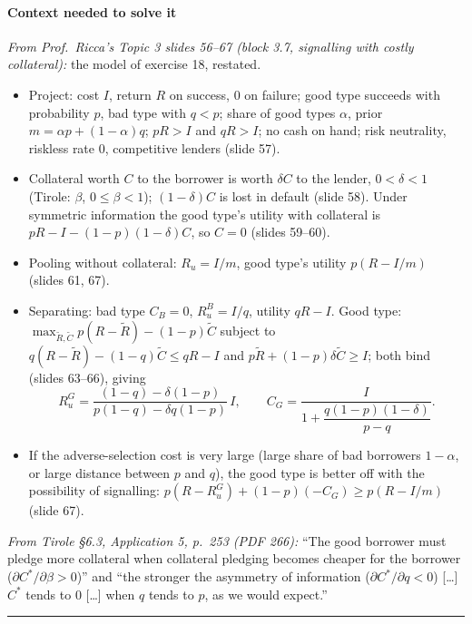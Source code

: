 \documentclass[11pt,a4paper]{article}
\providecommand{\tightlist}{\setlength{\itemsep}{0pt}\setlength{\parskip}{0pt}}
\newcommand{\stmtend}{\par\endgroup\nopagebreak\noindent\rule{\linewidth}{0.4pt}\par\medskip}
\begin{document}
\paragraph{Context needed to solve it}

\emph{From Prof.~Ricca's Topic 3 slides 56--67 (block 3.7, signalling with costly collateral):} the
model of exercise 18, restated.

\begin{itemize}
\tightlist
\item
  Project: cost \(I\), return \(R\) on success, 0 on failure; good type succeeds with probability
  \(p\), bad type with \(q < p\); share of good types \(\alpha\), prior
  \(m = \alpha p + (1 - \alpha)q\); \(pR > I\) and \(qR > I\); no cash on hand; risk neutrality,
  riskless rate 0, competitive lenders (slide 57).
\item
  Collateral worth \(C\) to the borrower is worth \(\delta C\) to the lender, \(0 < \delta < 1\)
  (Tirole: \(\beta\), \(0 \le \beta < 1\)); \((1 - \delta)C\) is lost in default (slide 58). Under
  symmetric information the good type's utility with collateral is
  \(pR - I - (1 - p)(1 - \delta)C\), so \(C = 0\) (slides 59--60).
\item
  Pooling without collateral: \(R_u = I/m\), good type's utility \(p(R - I/m)\) (slides 61, 67).
\item
  Separating: bad type \(C_B = 0\), \(R_u^B = I/q\), utility \(qR - I\). Good type:
  \(\max_{\tilde R, \tilde C} p(R - \tilde R) - (1 - p)\tilde C\) subject to
  \(q(R - \tilde R) - (1 - q)\tilde C \le qR - I\) and \(p\tilde R + (1 - p)\delta\tilde C \ge I\);
  both bind (slides 63--66), giving
  \[R_u^G = \frac{(1 - q) - \delta(1 - p)}{p(1 - q) - \delta q(1 - p)}\,I, \qquad C_G = \frac{I}{1 + \dfrac{q(1 - p)(1 - \delta)}{p - q}}.\]
\item
  If the adverse-selection cost is very large (large share of bad borrowers \(1 - \alpha\), or large
  distance between \(p\) and \(q\)), the good type is better off with the possibility of signalling:
  \(p(R - R_u^G) + (1 - p)(-C_G) \ge p(R - I/m)\) (slide 67).
\end{itemize}

\emph{From Tirole §6.3, Application 5, p.~253 (PDF 266):} ``The good borrower must pledge more
collateral when collateral pledging becomes cheaper for the borrower
(\(\partial C^*/\partial\beta > 0\))'' and ``the stronger the asymmetry of information
(\(\partial C^*/\partial q < 0\)) {[}\ldots{]} \(C^*\) tends to 0 {[}\ldots{]} when \(q\) tends to
\(p\), as we would expect.''
\stmtend
\end{document}
